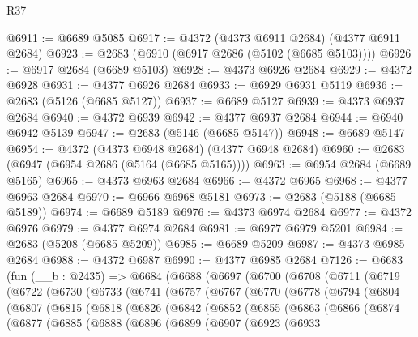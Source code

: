 \begin{lexlean}{R37}
\begin{coremodule}
@6911 := @6689 @5085
@6917 := @4372 (@4373 @6911 @2684) (@4377 @6911 @2684)
@6923 := @2683 (@6910 (@6917 @2686 (@5102 (@6685 @5103))))
@6926 := @6917 @2684 (@6689 @5103)
@6928 := @4373 @6926 @2684
@6929 := @4372 @6928
@6931 := @4377 @6926 @2684
@6933 := @6929 @6931 @5119
@6936 := @2683 (@5126 (@6685 @5127))
@6937 := @6689 @5127
@6939 := @4373 @6937 @2684
@6940 := @4372 @6939
@6942 := @4377 @6937 @2684
@6944 := @6940 @6942 @5139
@6947 := @2683 (@5146 (@6685 @5147))
@6948 := @6689 @5147
@6954 := @4372 (@4373 @6948 @2684) (@4377 @6948 @2684)
@6960 := @2683 (@6947 (@6954 @2686 (@5164 (@6685 @5165))))
@6963 := @6954 @2684 (@6689 @5165)
@6965 := @4373 @6963 @2684
@6966 := @4372 @6965
@6968 := @4377 @6963 @2684
@6970 := @6966 @6968 @5181
@6973 := @2683 (@5188 (@6685 @5189))
@6974 := @6689 @5189
@6976 := @4373 @6974 @2684
@6977 := @4372 @6976
@6979 := @4377 @6974 @2684
@6981 := @6977 @6979 @5201
@6984 := @2683 (@5208 (@6685 @5209))
@6985 := @6689 @5209
@6987 := @4373 @6985 @2684
@6988 := @4372 @6987
@6990 := @4377 @6985 @2684
@7126 := @6683
    (fun (__b : @2435) =>
    @6684
      (@6688
        (@6697
          (@6700
            (@6708
              (@6711
                (@6719
                  (@6722
                    (@6730
                      (@6733
                        (@6741
                          (@6757
                            (@6767
                              (@6770
                                (@6778
                                  (@6794
                                    (@6804
                                      (@6807
                                        (@6815
                                          (@6818
                                            (@6826
                                              (@6842
                                                (@6852
                                                  (@6855
                                                    (@6863
                                                      (@6866
                                                        (@6874
                                                          (@6877
                                                            (@6885
                                                              (@6888
                                                                (@6896
                                                                  (@6899
                                                                    (@6907
                                                                      (@6923
                                                                        (@6933

\end{coremodule}
\end{lexlean}
